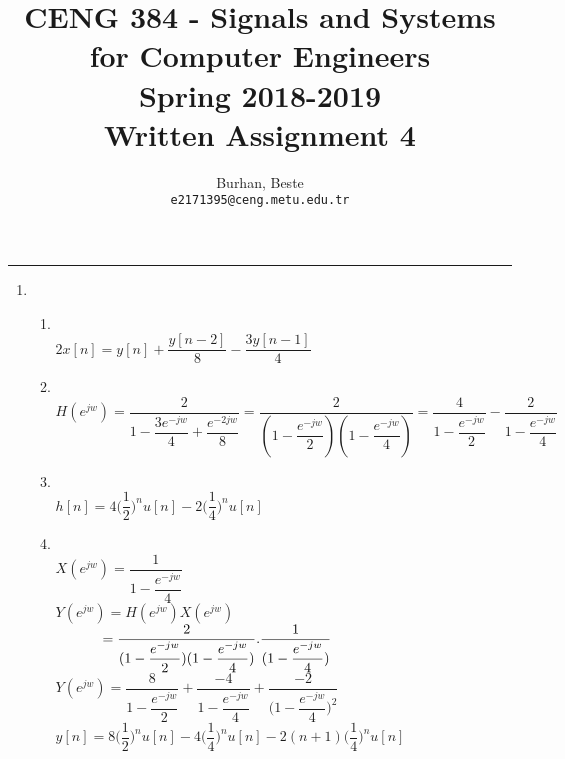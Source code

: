 \documentclass[10pt,a4paper, margin=1in]{article}
\author{
  Burhan, Beste\\
  \texttt{e2171395@ceng.metu.edu.tr}
}
\title{CENG 384 - Signals and Systems for Computer Engineers \\
Spring 2018-2019 \\
Written Assignment 4}
\begin{document}
\maketitle



\noindent\rule{19cm}{1.2pt}

\begin{enumerate}

\item 
    \begin{enumerate}
    \item %
    \ \\
	$ 2x[n] = y[n]+ \dfrac{y[n-2]}{8}-\dfrac{3y[n-1]}{4} $\\
    \item %
    \ \\
    $H(e^{jw}) = \dfrac{2}{1-\dfrac{3e^{-jw}}{4}+\dfrac{e^{-2jw}}{8}} = \dfrac{2}{(1-\dfrac{e^{-jw}}{2})(1-\dfrac{e^{-jw}}{4})} = \dfrac{4}{1-\dfrac{e^{-jw}}{2}}- \dfrac{2}{1-\dfrac{e^{-jw}}{4}}$
   	\item
   	\ \\
   	$h[n]=4\Big(\dfrac{1}{2}\Big)^n u[n]-2\Big(\dfrac{1}{4}\Big)^n u[n]$\\
   	\item
   	\ \\
   	$X(e^{jw})=\dfrac{1}{1-\dfrac{e^{-jw}}{4}}$\\
   	$Y(e^{jw})=H(e^{jw})X(e^{jw})$\\
   	$ \null \qquad \quad =  \dfrac{2}{(1-\dfrac{e^{-jw}}{2})(1-\dfrac{e^{-jw}}{4})}.\dfrac{1}{(1-\dfrac{e^{-jw}}{4})}$\\
   	$Y(e^{jw})= \dfrac{8}{1-\dfrac{e^{-jw}}{2}}+ \dfrac{-4}{1-\dfrac{e^{-jw}}{4}} + \dfrac{-2}{\Big(1-\dfrac{e^{-jw}}{4}\Big)^2}$\\
   	$y[n]=8\Big(\dfrac{1}{2}\Big)^n u[n] -4\Big(\dfrac{1}{4}\Big)^n u[n] -2(n+1)\Big(\dfrac{1}{4}\Big)^n u[n]  $
   	  \ \\
   	  \ \\
   	  


\end{enumerate}



\end{enumerate}
\end{document}

